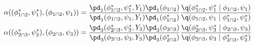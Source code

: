 \begin{align}
  \alpha((\phi_{1 \cap 2}^{*}, \psi_{1}^{*}), (\phi_{1 \cap 2}, \psi_{1})) &= 
  \frac {
    \pd_{1}(\phi_{1 \cap 2}^{*}, \psi_{1}^{*}, Y_{1})
    \pd_{1}(\phi_{1 \cap 2})
  } {
    \pd_{1}(\phi_{1 \cap 2}, \psi_{1}, Y_{1})
    \pd_{1}(\phi_{1 \cap 2}^{*})
  }
  \frac {
    \q(\phi_{1 \cap 2}^{*}, \psi_{1}^{*} \mid \phi_{1 \cap 2}, \psi_{1})
  } {
    \q(\phi_{1 \cap 2}, \psi_{1} \mid \phi_{1 \cap 2}^{*}, \psi_{1}^{*})
  } \\
  \alpha((\phi_{2 \cap 3}^{*}, \psi_{3}^{*}), (\phi_{2 \cap 3}, \psi_{3})) &= 
  \frac {
    \pd_{3}(\phi_{2 \cap 3}^{*}, \psi_{3}^{*}, Y_{3})
    \pd_{3}(\phi_{2 \cap 3})
  } {
    \pd_{3}(\phi_{2 \cap 3}, \psi_{3}, Y_{3})
    \pd_{3}(\phi_{2 \cap 3}^{*})
  }
  \frac {
    \q(\phi_{2 \cap 3}^{*}, \psi_{3}^{*} \mid \phi_{2 \cap 3}, \psi_{3})
  } {
    \q(\phi_{2 \cap 3}, \psi_{3} \mid \phi_{2 \cap 3}^{*}, \psi_{3}^{*})
  }  
  \label{eqn:stage-one-acceptance-probs}  
\end{align}